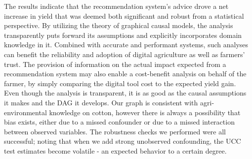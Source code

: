 \documentclass[letterpaper]{article} %
\begin{document}
The results indicate that the recommendation system's advice drove a net increase in yield that was deemed both significant and robust from a statistical perspective. By utilizing the theory of graphical causal models, the analysis transparently puts forward its assumptions and explicitly incorporates domain knowledge in it. Combined with accurate and performant systems, such analyses can benefit the reliability and adoption of digital agriculture as well as farmers' trust. The provision of information on the actual impact expected from a recommendation system may also enable a cost-benefit analysis on behalf of the farmer, by simply comparing the digital tool cost to the expected yield gain.  Even though the analysis is transparent, it is as good as the causal assumptions it makes and the DAG it develops. Our graph is consistent with agri-environmental knowledge on cotton, however there is always a possibility that bias exists, either due to a missed confounder or due to a missed interaction between observed variables. The robustness checks we performed were all successful; noting that when we add strong unobserved confounding, the UCC test estimates become volatile - an expected behavior to a certain degree.
\end{document}
